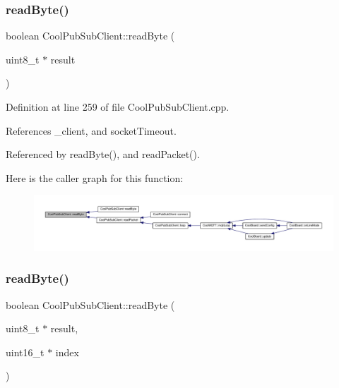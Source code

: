 \subsubsection{\texorpdfstring{read\+Byte()}{readByte()}\hspace{0.1cm}{\footnotesize\ttfamily [1/2]}}
{\footnotesize\ttfamily boolean Cool\+Pub\+Sub\+Client\+::read\+Byte (\begin{DoxyParamCaption}\item[{uint8\+\_\+t $\ast$}]{result }\end{DoxyParamCaption})\hspace{0.3cm}{\ttfamily [private]}}



Definition at line 259 of file Cool\+Pub\+Sub\+Client.\+cpp.



References \+\_\+client, and socket\+Timeout.



Referenced by read\+Byte(), and read\+Packet().

Here is the caller graph for this function\+:\nopagebreak
\begin{figure}[H]
\begin{center}
\leavevmode
\includegraphics[width=350pt]{d8/d4b/class_cool_pub_sub_client_ad409bbd287d5894f0cf082f62446c002_icgraph}
\end{center}
\end{figure}
\mbox{\label{class_cool_pub_sub_client_abef3735bb9a2a8c87b3da659dc4ade03}} 
\subsubsection{\texorpdfstring{read\+Byte()}{readByte()}\hspace{0.1cm}{\footnotesize\ttfamily [2/2]}}
{\footnotesize\ttfamily boolean Cool\+Pub\+Sub\+Client\+::read\+Byte (\begin{DoxyParamCaption}\item[{uint8\+\_\+t $\ast$}]{result,  }\item[{uint16\+\_\+t $\ast$}]{index }\end{DoxyParamCaption})\hspace{0.3cm}{\ttfamily [private]}}



